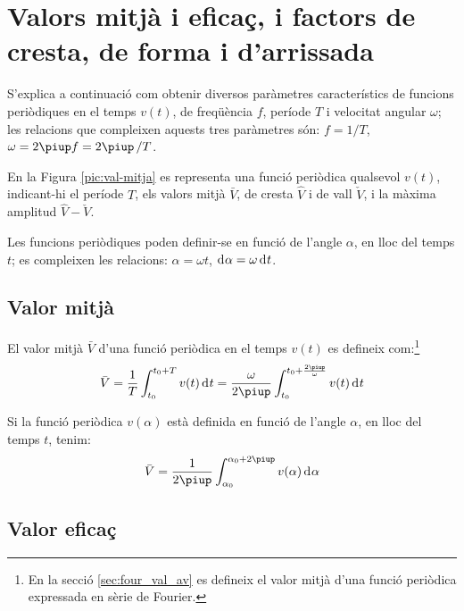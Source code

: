 \section{Valors mitjà i eficaç, i factors de cresta, de forma i d'arrissada}\label{sec:val_mitja_ef}

S'explica a continuació com obtenir diversos paràmetres característics de funcions periòdiques  en el temps $v(t)$, de freqüència $f$, període $T$ i velocitat angular $\omega$; les relacions que compleixen aquests tres paràmetres són: $f = 1/T$, $\omega=2\piup f = 2\piup\,/T$.

En la Figura \vref{pic:val-mitja} es representa una funció periòdica qualsevol $v(t)$, indicant-hi el període $T$, els valors mitjà $\bar{V}$, de cresta $\hat{V}$ i de vall $\check{V}$, i la màxima amplitud  $\hat{V}-\check{V}$.
\begin{center}
    
    \label{pic:val-mitja}
\end{center}

Les funcions periòdiques poden  definir-se en funció de l'angle $\alpha$, en lloc del temps $t$; es compleixen les relacions:
$\alpha=\omega t$, $\diff\alpha=\omega\diff t$.

\subsection{Valor mitjà}

El valor mitjà $\bar{V}$ d'una funció
periòdica en el temps $v(t)$ es
defineix com:\footnote{En la secció \ref{sec:four_val_av} es defineix el valor mitjà d'una funció periòdica expressada en sèrie de Fourier.}
\begin{equation}
    \bar{V} = \frac{1}{T} \int_{t_0}^{t_0+T} v(t) \diff t =
    \frac{\omega}{2\piup} \int_{t_0}^{t_0+\frac{2\piup}{\omega}} v(t) \diff t\label{eq:vm_t}
\end{equation}

Si la funció periòdica $v(\alpha)$ està definida en funció de
l'angle $\alpha$, en lloc del temps $t$, tenim:
\begin{equation}
    \bar{V} = \frac{1}{2\piup} \int_{\alpha_0}^{\alpha_0+2\piup} v(\alpha) \diff \alpha
    \label{eq:vm_alfa}
\end{equation}

\subsection{Valor eficaç}

